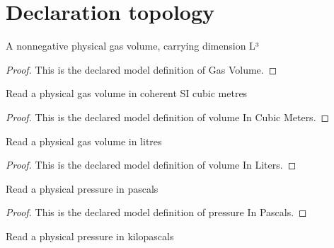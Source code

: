\section{Declaration topology}
\begin{definition}
  \label{def:physics:phyx-mini-0460:phyxminiproblems-problemphyxmini0460-gasvolume}
  A nonnegative physical gas volume, carrying dimension L³
\end{definition}
\begin{proof}
  This is the declared model definition of Gas Volume.
\end{proof}
\begin{definition}
  \label{def:physics:phyx-mini-0460:phyxminiproblems-problemphyxmini0460-volumeincubicmeters}
  Read a physical gas volume in coherent SI cubic metres
\end{definition}
\begin{proof}
  This is the declared model definition of volume In Cubic Meters.
\end{proof}
\begin{definition}
  \label{def:physics:phyx-mini-0460:phyxminiproblems-problemphyxmini0460-volumeinliters}
  Read a physical gas volume in litres
\end{definition}
\begin{proof}
  This is the declared model definition of volume In Liters.
\end{proof}
\begin{definition}
  \label{def:physics:phyx-mini-0460:phyxminiproblems-problemphyxmini0460-pressureinpascals}
  Read a physical pressure in pascals
\end{definition}
\begin{proof}
  This is the declared model definition of pressure In Pascals.
\end{proof}
\begin{definition}
  \label{def:physics:phyx-mini-0460:phyxminiproblems-problemphyxmini0460-pressureinkilopascals}
  Read a physical pressure in kilopascals
\end{definition}
